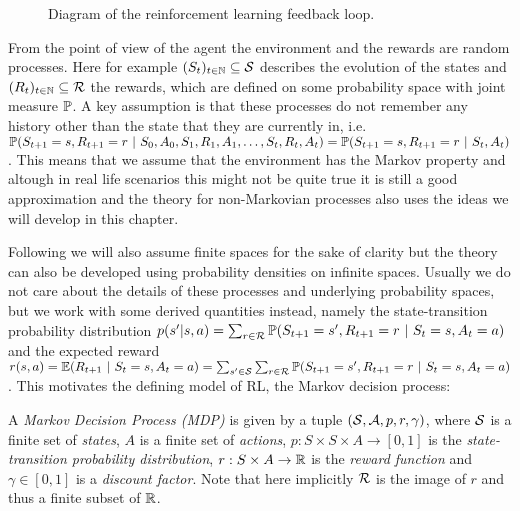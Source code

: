 \usetikzlibrary{graphs, quotes}
\begin{figure}[h]
    \centering
    \caption{Diagram of the reinforcement learning feedback loop.}
    \label{fig:rl_framework}
\end{figure}

From the point of view of the agent the environment and the rewards are random processes. Here for example $(S_t)_{t \in \N} \subseteq \S$ describes the evolution of the states and $(R_t)_{t \in \N} \subseteq \calR$ the rewards, which are defined on some probability space with joint measure $\P$. A key assumption is that these processes do not remember any history other than the state that they are currently in, i.e. $\P(S_{t+1} = s, R_{t+1} = r \ | \ S_0, A_0, S_1, R_1, A_1, \dots, S_t, R_t, A_t) = \P(S_{t+1} = s, R_{t+1} = r \ | \ S_t, A_t)$.
This means that we assume that the environment has the Markov property and altough in real life scenarios this might not be quite true it is still a good approximation and the theory for non-Markovian processes also uses the ideas we will develop in this chapter.

Following \cite{RL2018} we will also assume finite spaces for the sake of clarity but the theory can also be developed using probability densities on infinite spaces. Usually we do not care about the details of these processes and underlying probability spaces, but we work with some derived quantities instead, namely the state-transition probability distribution $p(s' | s, a) = \sum_{r \in \calR} \P(S_{t+1} = s', R_{t+1} = r \ | \ S_t = s, A_t = a)$ and the expected reward $r(s,a) = \E(R_{t+1} \ | \ S_t = s, A_t = a) = \sum_{s' \in \S} \sum_{r \in \calR} \P(S_{t+1} = s', R_{t+1} = r \ | \ S_t = s, A_t = a)$. This motivates the defining model of RL, the Markov decision process: 

\begin{definition}
    \label{def:mdp}
    A \emph{Markov Decision Process (MDP)} is given by a tuple $(\S, \A, p, r, \gamma)$, where $\S$ is a finite set of \emph{states}, $A$ is a finite set of \emph{actions}, $p: S \times S \times A \to [0,1]$ is the \emph{state-transition probability distribution}, $r: S \times A \to \R$ is the \emph{reward function} and $\gamma \in [0,1]$ is a \emph{discount factor}.
    Note that here implicitly $\calR$ is the image of $r$ and thus a finite subset of $\R$.
\end{definition}

